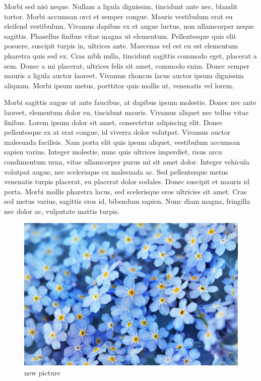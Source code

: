 \documentclass[a4paper,12pt]{article}
\begin{document}
	Morbi sed nisi neque. Nullam a ligula dignissim, tincidunt ante nec, blandit tortor. Morbi accumsan orci et semper congue. Mauris vestibulum erat eu eleifend vestibulum. Vivamus dapibus ex et augue luctus, non ullamcorper neque sagittis. Phasellus finibus vitae magna ut elementum. Pellentesque quis elit posuere, suscipit turpis in, ultrices ante. Maecenas vel est eu est elementum pharetra quis sed ex. Cras nibh nulla, tincidunt sagittis commodo eget, placerat a sem. Donec a mi placerat, ultrices felis sit amet, commodo enim. Donec semper mauris a ligula auctor laoreet. Vivamus rhoncus lacus auctor ipsum dignissim aliquam. Morbi ipsum metus, porttitor quis mollis ut, venenatis vel lorem.
	
	Morbi sagittis augue ut ante faucibus, at dapibus ipsum molestie. Donec nec ante laoreet, elementum dolor eu, tincidunt mauris. Vivamus aliquet nec tellus vitae finibus. Lorem ipsum dolor sit amet, consectetur adipiscing elit. Donec pellentesque ex at erat congue, id viverra dolor volutpat. Vivamus auctor malesuada facilisis. Nam porta elit quis ipsum aliquet, vestibulum accumsan sapien varius. Integer molestie, nunc quis ultrices imperdiet, risus arcu condimentum urna, vitae ullamcorper purus mi sit amet dolor. Integer vehicula volutpat augue, nec scelerisque ex malesuada ac. Sed pellentesque metus venenatis turpis placerat, eu placerat dolor sodales. Donec suscipit et mauris id porta. Morbi mollis pharetra lacus, sed scelerisque eros ultricies sit amet. Cras sed metus varius, sagittis eros id, bibendum sapien. Nunc diam magna, fringilla nec dolor ac, vulputate mattis turpis.
	
	\begin{figure}
		\includegraphics[scale=.16]{images/f3.jpeg}
		\caption{new picture}
	\end{figure}
	
\end{document}
